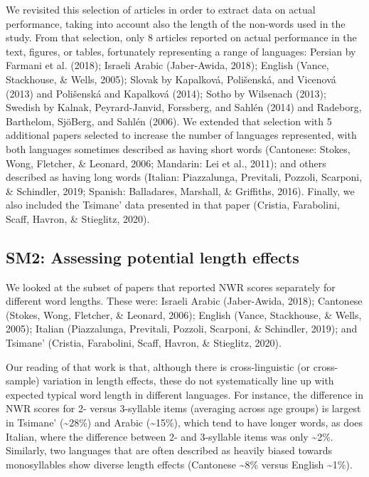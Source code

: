 \documentclass[
  american,
  ,doc,floatsintext]{apa6}
\begin{document}
We revisited this selection of articles in order to extract data on actual performance, taking into account also the length of the non-words used in the study. From that selection, only 8 articles reported on actual performance in the text, figures, or tables, fortunately representing a range of languages: Persian by Farmani et al. (2018); Israeli Arabic (Jaber-Awida, 2018); English (Vance, Stackhouse, \& Wells, 2005); Slovak by Kapalková, Polišenská, and Vicenová (2013) and Polišenská and Kapalková (2014); Sotho by Wilsenach (2013); Swedish by Kalnak, Peyrard-Janvid, Forssberg, and Sahlén (2014) and Radeborg, Barthelom, SjöBerg, and Sahlén (2006). We extended that selection with 5 additional papers selected to increase the number of languages represented, with both languages sometimes described as having short words (Cantonese: Stokes, Wong, Fletcher, \& Leonard, 2006; Mandarin: Lei et al., 2011); and others described as having long words (Italian: Piazzalunga, Previtali, Pozzoli, Scarponi, \& Schindler, 2019; Spanish: Balladares, Marshall, \& Griffiths, 2016). Finally, we also included the Tsimane' data presented in that paper (Cristia, Farabolini, Scaff, Havron, \& Stieglitz, 2020).

\hypertarget{sm2-assessing-potential-length-effects}{%
\subsection{SM2: Assessing potential length effects}\label{sm2-assessing-potential-length-effects}}

We looked at the subset of papers that reported NWR scores separately for different word lengths. These were: Israeli Arabic (Jaber-Awida, 2018); Cantonese (Stokes, Wong, Fletcher, \& Leonard, 2006); English (Vance, Stackhouse, \& Wells, 2005); Italian (Piazzalunga, Previtali, Pozzoli, Scarponi, \& Schindler, 2019); and Tsimane' (Cristia, Farabolini, Scaff, Havron, \& Stieglitz, 2020).

Our reading of that work is that, although there is cross-linguistic (or cross-sample) variation in length effects, these do not systematically line up with expected typical word length in different languages. For instance, the difference in NWR scores for 2- versus 3-syllable items (averaging across age groups) is largest in Tsimane' (\textasciitilde28\%) and Arabic (\textasciitilde15\%), which tend to have longer words, as does Italian, where the difference between 2- and 3-syllable items was only \textasciitilde2\%. Similarly, two languages that are often described as heavily biased towards monosyllables show diverse length effects (Cantonese \textasciitilde8\% versus English \textasciitilde1\%).
\end{document}
